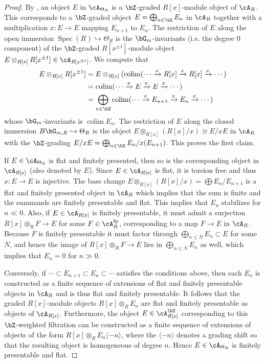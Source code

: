 \documentclass[a4paper]{amsart}
\numberwithin{equation}{section}
\theoremstyle{plain}
\theoremstyle{definition}
\DeclareMathOperator{\Spec}{Spec}
\newcommand{\hookarr}{\hookrightarrow}
\DeclareMathOperator{\colim}{colim}
\newcommand{\co}{\colon}
\newcommand{\tensor}{\otimes}
\begin{document}
\begin{proof}  
	By , an object $E$ in $\cA_{\Theta_R}$ is a $\bZ$-graded $R[x]$-module object of $\cA_R$.  This corresponds to a $\bZ$-graded object $E = \bigoplus_{n \in \bZ} E_n$ in $\cA_R$ together with a multiplication $x \co E \to E$ mapping $E_{n+1}$ to $E_{n}$.
	The restriction of $E$ along the open immersion $\Spec(R) \hookarr \Theta_R$ is the $\bG_m$-invariants (i.e. the degree $0$ component) of the $\bZ$-graded $R[x^{\pm1}]$-module object $E \tensor_{R[x]} R[x^{\pm1}] \in \cA_{R[x^{\pm1}]}$.   We compute that
	$$\begin{aligned}
	E \tensor_{R[x]} R[x^{\pm1}]  & = E \tensor_{R[x]} (\colim( \cdots \xrightarrow{x} R{[x]} \xrightarrow{x} R{[x]} \xrightarrow{x} \cdots) \\
	& = \colim ( \cdots \xrightarrow{x} E \xrightarrow{x} E \xrightarrow{x} \cdots) \\
	& = \bigoplus_{n \in \bZ} \colim (\cdots \xrightarrow{x} E_{n+1} \xrightarrow{x} E_{n} \xrightarrow{x} \cdots)
	\end{aligned}$$
	whose $\bG_m$-invariants is $\colim E_n$. The restriction of $E$ along the closed immersion $B \bG_{m,R} \hookarr \Theta_R$ is the object $E \tensor_{R[x]} (R[x]/x) \cong E/xE$ in $\cA_R$ with the $\bZ$-grading $E/xE = \bigoplus_{n \in \bZ} E_{n} / x(E_{n+1})$. This proves the first claim.
	
	If $E  \in \cA_{\Theta_R}$ is flat and finitely presented, then so is the corresponding object in $\cA_{R[x]}$ (also denoted by $E$).  Since $E \in \cA_{R[x]}$ is flat, it is torsion free and thus $x \co E \to E$ is injective.  The base change $E \tensor_{R[x]} (R[x]/x)= \bigoplus E_n / E_{n+1}$ is a flat and finitely presented object in $\cA_R$ which implies that the sum is finite and the summands are finitely presentable and flat. This implies that $E_n$ stabilizes for $n \ll 0$. Also, if $E \in \cA_{R[x]}$ is finitely presentable, it must admit a surjection $R[x] \otimes_R F \to E$ for some $F \in \cA_R^{\rm{fp}}$, corresponding to a map $F \to E$ in $\cA_R$.  Because $F$ is finitely presentable it must factor through $\bigoplus_{n \leq N} E_n \subset E$ for some $N$, and hence the image of $R[x] \otimes_R F \to E$ lies in  $\bigoplus_{n \leq N} E_n$ as well, which implies that $E_n = 0$ for $n \gg 0$.
	
	Conversely, if $\cdots \subset E_{n+1} \subset E_n \subset \cdots$ satisfies the conditions above, then each $E_n$ is constructed as a finite sequence of extensions of flat and finitely presentable objects in $\cA_R$ and is thus flat and finitely presentable. It follows that the graded $R[x]$-module objects $R[x] \otimes_R E_n$ are flat and finitely presentable as objects of $\cA_{R[x]}$. Furthermore, the object $E \in \cA_{R[x]}^\bZ$ corresponding to this $\bZ$-weighted filtration 
	can be constructed as a finite sequence of extensions of objects of the form $R[x] \otimes_R E_n\langle-n\rangle$, where the $\langle -n \rangle$ denotes a grading shift so that the resulting object is homogeneous of degree $n$. Hence $E \in \cA_{\Theta_R}$ is finitely presentable and flat.
\end{proof}
\end{document}
